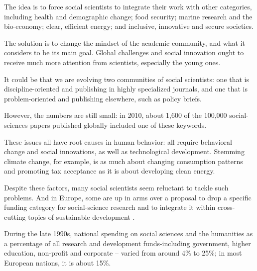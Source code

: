 \vspace{6pt}

\qquad [A] The idea is to force social scientists to integrate their work with other categories, including health and demographic change; food security; marine research and the bio-economy; clear, efficient energy; and inclusive, innovative and secure societies.

\qquad [B] The solution is to change the mindset of the academic community, and what it considers to be its main goal. Global challenges and social innovation ought to receive much more attention from scientists, especially the young ones.

\qquad [A] It could be that we are evolving two communities of social
scientists: one that is discipline-oriented and publishing in highly
specialized journals, and one that is problem-oriented and publishing
elsewhere, such as policy briefs.

\qquad [B] However, the numbers are still small: in 2010, about 1,600 of the 100,000 social-sciences papers published globally included one of these keywords.

\qquad [E] These issues all have root causes in human behavior: all require behavioral change and social innovations, as well as technological 
development. Stemming climate change, for example, is as much about changing consumption patterns and promoting tax acceptance as it is about developing clean energy.

\qquad [F] Despite these factors, many social scientists seem reluctant to tackle such problems. And in Europe, some are up in arms over a proposal to drop a specific funding category for social-science research and to integrate it within cross-cutting topics of sustainable development .

\qquad [G] During the late 1990s, national spending on social sciences and the humanities as a percentage of all research and development funds-including government, higher education, non-profit and corporate -- varied from around 4\% to 25\%; in most European nations, it is about 15\%.
